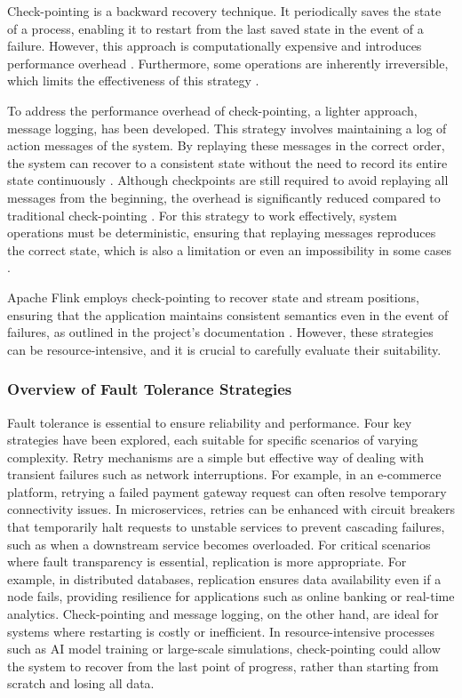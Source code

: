 Check-pointing is a backward recovery technique. It periodically saves the state of a process, enabling it to restart from the last saved state in the event of a failure. However, this approach is computationally expensive and introduces performance overhead \cite{Tanenbaum2023,Isukapalli2024}. Furthermore, some operations are inherently irreversible, which limits the effectiveness of this strategy \cite{Tanenbaum2023,Ledmi2018}. 

To address the performance overhead of check-pointing, a lighter approach, message logging, has been developed. This strategy involves maintaining a log of action messages of the system. By replaying these messages in the correct order, the system can recover to a consistent state without the need to record its entire state continuously \cite{Isukapalli2024,Ledmi2018}. Although checkpoints are still required to avoid replaying all messages from the beginning, the overhead is significantly reduced compared to traditional check-pointing \cite{Isukapalli2024}. For this strategy to work effectively, system operations must be deterministic, ensuring that replaying messages reproduces the correct state, which is also a limitation or even an impossibility in some cases \cite{Tanenbaum2023}.

Apache Flink employs check-pointing to recover state and stream positions, ensuring that the application maintains consistent semantics even in the event of failures, as outlined in the project's documentation \cite{apache-flick}. However, these strategies can be resource-intensive, and it is crucial to carefully evaluate their suitability.

\subsubsection{Overview of Fault Tolerance Strategies}

Fault tolerance is essential to ensure reliability and performance. Four key strategies have been explored, each suitable for specific scenarios of varying complexity. Retry mechanisms are a simple but effective way of dealing with transient failures such as network interruptions. For example, in an e-commerce platform, retrying a failed payment gateway request can often resolve temporary connectivity issues. In microservices, retries can be enhanced with circuit breakers that temporarily halt requests to unstable services to prevent cascading failures, such as when a downstream service becomes overloaded. For critical scenarios where fault transparency is essential, replication is more appropriate. For example, in distributed databases, replication ensures data availability even if a node fails, providing resilience for applications such as online banking or real-time analytics. Check-pointing and message logging, on the other hand, are ideal for systems where restarting is costly or inefficient. In resource-intensive processes such as \gls{AI} model training or large-scale simulations, check-pointing could allow the system to recover from the last point of progress, rather than starting from scratch and losing all data.


